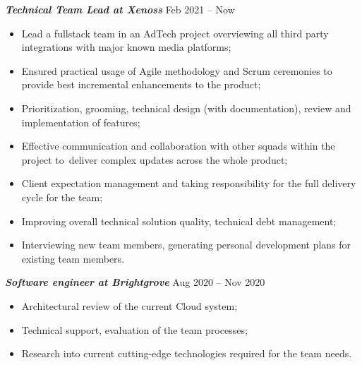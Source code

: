 \documentclass[margin, 10pt]{res} %
\begin{document}
\begin{resume}
{\sl \bf Technical Team Lead at Xenoss } \hfill Feb 2021 -- Now
\vspace{3px}
\begin{itemize}
 \item Lead a fullstack team in an AdTech project overviewing all third party integrations with major known media platforms;
 \item Ensured practical usage of Agile methodology and Scrum ceremonies to provide best incremental enhancements to the product;
 \item Prioritization, grooming, technical design (with documentation), review and implementation of features;
 \item Effective communication and collaboration with other squads within the project to~deliver complex updates across the whole product;
 \item Client expectation management and taking responsibility for the full delivery cycle for the team;
 \item Improving overall technical solution quality, technical debt management;
 \item Interviewing new team members, generating personal development plans for existing team members.
\end{itemize}

{\sl \bf Software engineer at Brightgrove } \hfill Aug 2020 -- Nov 2020
\vspace{3px}
\begin{itemize}
 \item Architectural review of the current Cloud system;
 \item Technical support, evaluation of the team processes;
 \item Research into current cutting-edge technologies required for the team needs.
\end{itemize}


\end{resume}
\end{document}
